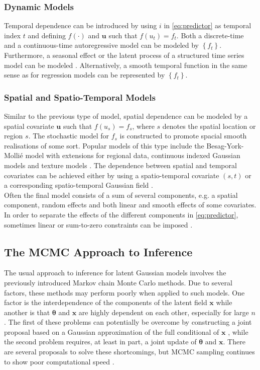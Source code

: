 \subsubsection{Dynamic Models}
Temporal dependence can be introduced by using $i$ in \eqref{eq:predictor} as temporal index $t$ and defining $f\left(\cdot\right)$ and $\pmb{u}$ such that $f\left(u_t\right)=f_t$. Both a discrete-time and a continuous-time autoregressive model can be modeled by $\left\lbrace f_t\right\rbrace$. Furthermore, a seasonal effect or the latent process of a structured time series model can be modeled \autocite[][]{kitagawa1996smoothness}. Alternatively, a smooth temporal function in the same sense as for regression models can be represented by $\left\lbrace f_t\right\rbrace$.
\subsubsection{Spatial and Spatio-Temporal Models}
Similar to the previous type of model, spatial dependence can be modeled by a spatial covariate $\pmb{u}$ such that $f\left(u_s\right)=f_s$, where $s$ denotes the spatial location or region $s$. The stochastic model for $f_s$ is constructed to promote spacial smooth realisations of some sort. Popular models of this type include the Besag-York-Mollié \autocite[][]{besag1991bayesian} model with extensions for regional data, continuous indexed Gaussian models \autocite[][]{banerjee2014hierarchical} and texture models \autocite[][]{marroquin2001gauss}. The dependence between spatial and temporal covariates can be achieved either by using a spatio-temporal covariate $(s,t)$ or a corresponding spatio-temporal Gaussian field \autocite[][]{kammann2003geoadditive}.\\
Often the final model consists of a sum of several components, e.g. a spatial component, random effects and both linear and smooth effects of some covariates. In order to separate the effects of the different components in \eqref{eq:predictor}, sometimes linear or sum-to-zero constraints can be imposed \autocite[][319--321]{rue2009approximate}.
\subsection{The MCMC Approach to Inference}
The usual approach to inference for latent Gaussian models involves the previously introduced Markov chain Monte Carlo methods. Due to several factors, these methods may perform poorly when applied to such models. One factor is the interdependence of the components of the latent field $\pmb{x}$ while another is that $\pmb{\theta}$ and $\pmb{x}$ are highly dependent on each other, especially for large $n$. The first of these problems can potentially be overcome by constructing a joint proposal based on a Gaussian approximation of the full conditional of $\pmb{x}$ \autocite[][]{gamerman1997sampling}, while the second problem requires, at least in part, a joint update of $\pmb{\theta}$ and $\pmb{x}$. There are several proposals to solve these shortcomings, but MCMC sampling continues to show poor computational speed \autocite[][322]{rue2009approximate}.
